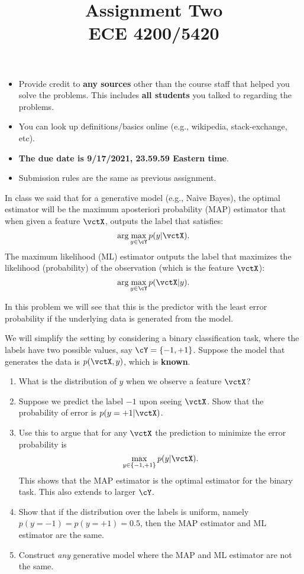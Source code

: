 \documentclass[11pt]{article}
\title{Assignment Two\\ ECE 4200/5420}
\date{}
\newenvironment{problem}[2][Problem]{\begin{trivlist}
\item[\hskip \labelsep {\bfseries #1}\hskip \labelsep {\bfseries #2.}]}{\end{trivlist}}
\begin{document}
\maketitle 

\begin{itemize}
\item
Provide credit to \textbf{any sources} other than the course staff that helped you solve the problems. This includes \textbf{all students} you talked to regarding the problems. 	
\item
You can look up definitions/basics online (e.g., wikipedia, stack-exchange, etc).
\item
{\bf The due date is 9/17/2021, 23.59.59 Eastern time}. 
\item
Submission rules are the same as previous assignment.
\end{itemize}

\begin{problem}{1 (15 points)}
In class we said that for a generative model (e.g., Naive Bayes), the optimal estimator will be the maximum aposteriori probability (MAP) estimator that when given a feature $\vctX$, outputs the label that satisfies:
\[
\arg\max_{y\in\cY} p(y|\vctX).
\]
The maximum likelihood (ML) estimator outputs the label that maximizes the likelihood (probability) of the observation (which is the feature $\vctX$):
\[
\arg\max_{y\in\cY} p(\vctX|y).
\]

In this problem we will see that this is the predictor with the least error probability if the underlying data is generated from the model. 

We will simplify the setting by considering a binary classification task, where the labels have two possible values, say $\cY=\{-1, +1\}$. Suppose the model that generates the data is $p(\vctX, y)$, which is \textbf{known}. 

\begin{enumerate}
\item What is the distribution of $y$ when we observe a feature $\vctX$?

\item Suppose we predict the label $-1$ upon seeing $\vctX$. Show that the probability of error is $p(y=+1|\vctX)$. 
\item
Use this to argue that for any $\vctX$ the prediction to minimize the error probability is 
\[
\max_{y\in\{-1, +1\}	} p(y|\vctX).
\]
This shows that the MAP estimator is the optimal estimator for the binary task. This also extends to larger $\cY$. 
\item
Show that if the distribution over the labels is uniform, namely $p(y=-1)=p(y=+1)=0.5$, then the MAP estimator and ML estimator are the same. 
\item
Construct \emph{any} generative model where the MAP and ML estimator are not the same. 
\end{enumerate}
	
\end{problem}
\end{document}
